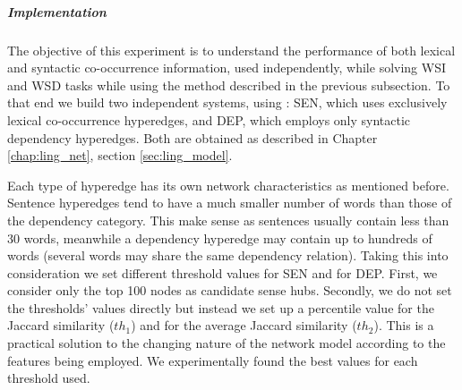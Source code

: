 \subparagraph{Implementation}
The objective of this experiment is to understand the performance of both lexical and syntactic co-occurrence information, used independently, while solving WSI and WSD tasks while using the method described in the previous subsection. To that end we build two independent systems, using : SEN, which uses exclusively lexical co-occurrence hyperedges, and DEP, which employs only syntactic dependency hyperedges. Both are obtained as described in Chapter \ref{chap:ling_net}, section \ref{sec:ling_model}.
 
Each type of hyperedge has its own network characteristics as mentioned before. Sentence hyperedges tend to have a much smaller number of words than those of the dependency category. This make sense as sentences usually contain less than 30 words, meanwhile a dependency hyperedge may contain up to hundreds of words (several words may share the same dependency relation). Taking this into consideration we set different threshold values for SEN and for DEP. First, we  consider only the top 100 nodes as candidate sense hubs. Secondly, we do not set the thresholds' values directly but instead we set up a percentile value for the Jaccard similarity ($th_1$) and for the average Jaccard similarity ($th_2$). This is a practical solution to the changing nature of the network model according to the features being employed. We experimentally found the best values for  each threshold used.



%



